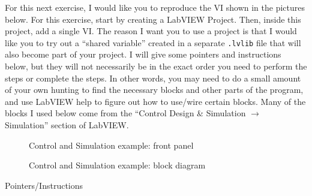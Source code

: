 \documentclass[11pt]{article}
\begin{document}
For this next exercise, I would like you to reproduce the VI shown in the pictures below. For this exercise, start by creating a LabVIEW Project. Then, inside this project, add a single VI. The reason I want you to use a project is that I would like you to try out a “shared variable” created in a separate \verb|.lvlib| file that will also become part of your project. I will give some pointers and instructions below, but they will not necessarily be in the exact order you need to perform the steps or complete the steps. In other words, you may need to do a small amount of your own hunting to find the necessary blocks and other parts of the program, and use LabVIEW help to figure out how to use/wire certain blocks. Many of the blocks I used below come from the “Control Design \& Simulation $\rightarrow$ Simulation” section of LabVIEW.
%
\begin{figure}[H]
    \centering
    \caption{Control and Simulation example: front panel}
\end{figure}
%
\begin{figure}[H]
    \centering
    \caption{Control and Simulation example: block diagram}
\end{figure}
%
Pointers/Instructions
%
\end{document}
